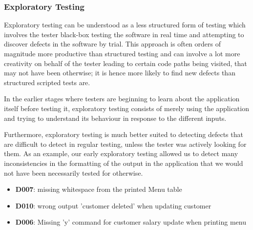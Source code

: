 \subsubsection{Exploratory Testing}

Exploratory testing can be understood as a less structured form of testing which involves the tester black-box testing the software in real time and attempting to discover defects in the software by trial. 
This approach is often orders of magnitude more productive than structured testing and can involve a lot more creativity on behalf of the tester leading to certain code paths being visited, that may not have been otherwise; it is hence more likely to find new defects than structured scripted tests are.
\par
In the earlier stages where testers are beginning to learn about the application itself before testing it, exploratory testing consists of merely using the application and trying to understand its behaviour in response to the different inputs. 
\par
Furthermore, exploratory testing is much better suited to detecting defects that are difficult to detect in regular testing, unless the tester was actively looking for them. 
As an example, our early exploratory testing allowed us to detect many inconsistencies in the formatting of the output in the application that we would not have been necessarily tested for otherwise.  

\begin{itemize}
    \item \textbf{D007}: missing whitespace from the printed Menu table
    \item \textbf{D010}: wrong output 'customer deleted' when updating customer
    \item \textbf{D006}: Missing 'y' command for customer salary update when printing menu
\end{itemize}